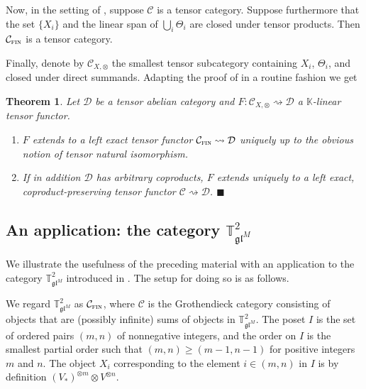 \documentclass[11pt]{article}
\theoremstyle{plain}
\newtheorem{theorem}[lemma]{Theorem}
\theoremstyle{nonumberplain}
\theoremstyle{plain}
\theoremstyle{nonumberplain}
\newcommand\bK{{\mathbb K}}
\newcommand\bT{{\mathbb T}}
\newcommand\cC{{\mathcal C}}
\newcommand\cD{{\mathcal D}}
\newcommand\fgl{\mathfrak{gl}}
\DeclareMathOperator{\fin}{\cat{fin}}
\newcommand{\cat}[1]{\textsc{#1}}
\newcommand{\qedhere}{\mbox{}\hfill\ensuremath{\blacksquare}}
\begin{document}
Now, in the setting of , suppose $\cC$ is a tensor category. Suppose furthermore that the set $\{X_i\}$ and the linear span of $\bigcup_i \Theta_i$ are closed under tensor products. Then $\cC_{\fin}$ is a tensor category. 

Finally, denote by $\cC_{X,\otimes}$ the smallest tensor subcategory containing $X_i$, $\Theta_i$, and closed under direct summands. Adapting the proof of  in a routine fashion we get 




\begin{theorem}\label{th.tens_univ}
Let $\cD$ be a tensor abelian category and $F:\cC_{X,\otimes}\rightsquigarrow \cD$ a $\bK$-linear tensor functor. 
\begin{enumerate}
\renewcommand{\labelenumi}{(\alph{enumi})}
\item $F$ extends to a left exact tensor functor $\cC_{\fin}\rightsquigarrow \cD$ uniquely up to the obvious notion of tensor natural isomorphism.  
\item If in addition $\cD$ has arbitrary coproducts, $F$ extends uniquely to a left exact, coproduct-preserving tensor functor $\cC\rightsquigarrow \cD$. \qedhere
\end{enumerate}
\end{theorem}








\subsection{An application: the category $\bT^2_{\fgl^M}$}
\label{subse.appl}



We illustrate the usefulness of the preceding material with an application to the category $\bT^2_{\fgl^M}$ introduced in . The setup for doing so is as follows. 

 We regard $\bT^2_{\fgl^M}$ as $\cC_{\fin}$, where $\cC$ is the Grothendieck category consisting of objects that are (possibly infinite) sums of objects in $\bT^2_{\fgl^M}$. The poset $I$ is the set of ordered pairs $(m,n)$ of nonnegative integers, and the order on $I$ is the smallest partial order such that $(m,n)\ge (m-1,n-1)$ for positive integers $m$ and $n$. The object $X_i$ corresponding to the element $i\in (m,n)$ in $I$ is by definition $(V_*)^{\otimes m}\otimes V^{\otimes n}$. 
\end{document}
